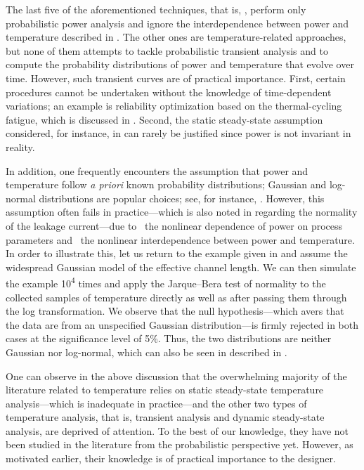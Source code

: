 The last five of the aforementioned techniques, that is, \cite{bhardwaj2006,
vrudhula2006, ghanta2006, bhardwaj2008, shen2009}, perform only probabilistic
power analysis and ignore the interdependence between power and temperature
described in . The other ones are temperature-related
approaches, but none of them attempts to tackle probabilistic transient analysis
and to compute the probability distributions of power and temperature that
evolve over time. However, such transient curves are of practical importance.
First, certain procedures cannot be undertaken without the knowledge of
time-dependent variations; an example is reliability optimization based on the
thermal-cycling fatigue, which is discussed in .
Second, the static steady-state assumption considered, for instance, in
\cite{huang2009a, juan2011, juan2012, lee2013} can rarely be justified since
power is not invariant in reality.

In addition, one frequently encounters the assumption that power and temperature
follow \emph{a priori} known probability distributions; Gaussian and log-normal
distributions are popular choices; see, for instance, \cite{bhardwaj2006,
srivastava2010, juan2012}. However, this assumption often fails in
practice---which is also noted in \cite{juan2012} regarding the normality of the
leakage current---due to \one~the nonlinear dependence of power on process
parameters and \two~the nonlinear interdependence between power and temperature.
In order to illustrate this, let us return to the example given in
 and assume the widespread Gaussian model of the
effective channel length. We can then simulate the example 10\textsuperscript{4}
times and apply the Jarque--Bera test of normality to the collected samples of
temperature directly as well as after passing them through the log
transformation. We observe that the null hypothesis---which avers that the data
are from an unspecified Gaussian distribution---is firmly rejected in both cases
at the significance level of 5\%. Thus, the two distributions are neither
Gaussian nor log-normal, which can also be seen in
 described in .

One can observe in the above discussion that the overwhelming majority of the
literature related to temperature relies on static steady-state temperature
analysis---which is inadequate in practice---and the other two types of
temperature analysis, that is, transient analysis and dynamic steady-state
analysis, are deprived of attention. To the best of our knowledge, they have not
been studied in the literature from the probabilistic perspective yet. However,
as motivated earlier, their knowledge is of practical importance to the
designer.

